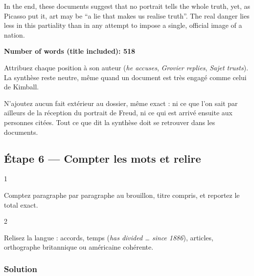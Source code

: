 \documentclass[11pt,a4paper]{article}
\begin{document}
In the end, these documents suggest that no portrait tells the whole truth, yet, as Picasso put it, art may be ``a lie that makes us realise truth''. The real danger lies less in this partiality than in any attempt to impose a single, official image of a nation.

\textbf{Number of words (title included): 518}

\begin{methode}

Attribuez chaque position à son auteur (\emph{he accuses}, \emph{Grovier replies}, \emph{Sajet trusts}). La synthèse reste neutre, même quand un document est très engagé comme celui de Kimball.

\end{methode}

\begin{piege}

N'ajoutez aucun fait extérieur au dossier, même exact : ni ce que l'on sait par ailleurs de la réception du portrait de Freud, ni ce qui est arrivé ensuite aux personnes citées. Tout ce que dit la synthèse doit se retrouver dans les documents.

\end{piege}

\hypertarget{uxe9tape-6-compter-les-mots-et-relire}{%
\subsection{Étape 6 --- Compter les mots et relire}\label{uxe9tape-6-compter-les-mots-et-relire}}

\begin{indication}{1}

Comptez paragraphe par paragraphe au brouillon, titre compris, et reportez le total exact.

\end{indication}

\begin{indication}{2}

Relisez la langue : accords, temps (\emph{has divided \ldots{} since 1886}), articles, orthographe britannique ou américaine cohérente.

\end{indication}

\hypertarget{solution-5}{%
\subsubsection{Solution}\label{solution-5}}
\end{document}
